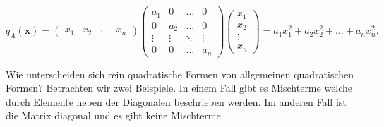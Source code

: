 \begin{equation*}
    q_A(\mathbf{x}) = \begin{pmatrix} x_1 & x_2 & \dots & x_n \end{pmatrix} \begin{pmatrix} a_1 & 0 & \dots & 0 \\ 0 & a_2 & \dots & 0 \\ \vdots & \vdots & \ddots & \vdots \\ 0 & 0 & \dots & a_n \end{pmatrix} \begin{pmatrix} x_1 \\ x_2 \\ \vdots \\ x_n \end{pmatrix} = a_1x_1^2 + a_2x_2^2 + \dots + a_nx_n^2.
\end{equation*}

Wie unterscheiden sich rein quadratische Formen von allgemeinen quadratischen Formen? Betrachten wir zwei Beispiele. In einem Fall gibt es Mischterme welche durch Elemente neben der Diagonalen beschrieben werden. Im anderen Fall ist die Matrix diagonal und es gibt keine Mischterme.

